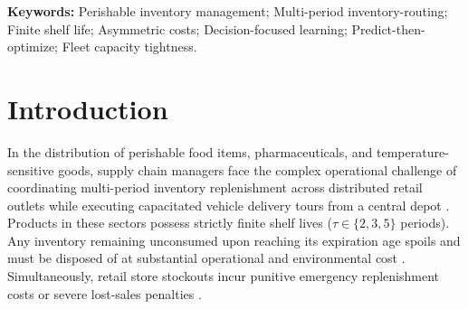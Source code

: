 \documentclass[11pt,a4paper]{article}
\theoremstyle{definition}
\theoremstyle{remark}
\begin{document}
\textbf{Keywords:} Perishable inventory management; Multi-period inventory-routing; Finite shelf life; Asymmetric costs; Decision-focused learning; Predict-then-optimize; Fleet capacity tightness.

\newpage

\section{Introduction}
\label{sec:introduction}

In the distribution of perishable food items, pharmaceuticals, and temperature-sensitive goods, supply chain managers face the complex operational challenge of coordinating multi-period inventory replenishment across distributed retail outlets while executing capacitated vehicle delivery tours from a central depot \citep{nahmias1982perishable,coelho2014optimal,amorim2012multiobjective}. Products in these sectors possess strictly finite shelf lives ($\tau \in \{2, 3, 5\}$ periods). Any inventory remaining unconsumed upon reaching its expiration age spoils and must be disposed of at substantial operational and environmental cost \citep{soysal2015modeling,liu2021sustainable}. Simultaneously, retail store stockouts incur punitive emergency replenishment costs or severe lost-sales penalties \citep{bertazzi2013stochastic,archetti2018stochastic}.
\end{document}
